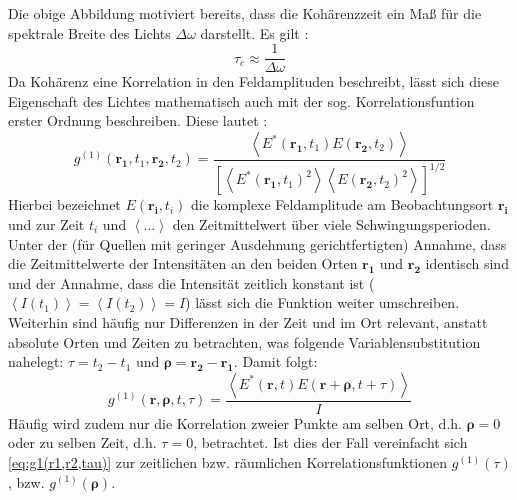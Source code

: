 Die obige Abbildung motiviert bereits, dass die Kohärenzzeit ein Maß für die spektrale Breite des Lichts $\Delta \omega$ darstellt. 
Es gilt \cite{foxQuantumOpticsIntroduction2006}:
\begin{equation}
    \tau_c  \approx \frac{1}{\Delta \omega}
    \label{eq:tau(delta nu)}
\end{equation}
Da Kohärenz eine Korrelation in den Feldamplituden beschreibt, lässt sich diese Eigenschaft des Lichtes mathematisch auch mit der sog. Korrelationsfuntion erster Ordnung beschreiben. 
Diese lautet \cite{foellmiIntensityInterferometrySecondorder2009}:
\begin{equation}
    g^{(1)}(\mathbf{r_1}, t_1, \mathbf{r_2}, t_2) = \frac{\left<E^*(\mathbf{r_1}, t_1)E(\mathbf{r_2}, t_2)\right>}{\left[\left<E^*(\mathbf{r_1}, t_1)^2\right> \left<E(\mathbf{r_2}, t_2)^2\right>\right]^{1/2}}
    \label{eq:g1(r1,t1,r2,t2)}
\end{equation}
Hierbei bezeichnet $E(\mathbf{r_i},t_i)$ die komplexe Feldamplitude am Beobachtungsort $\mathbf{r_i}$ und zur Zeit $t_i$ und $\left<\dots\right>$ den Zeitmittelwert über viele Schwingungsperioden. 
Unter der (für Quellen mit geringer Ausdehnung gerichtfertigten) Annahme, dass die Zeitmittelwerte der Intensitäten an den beiden Orten $\mathbf{r_1}$ und $\mathbf{r_2}$ identisch sind und der Annahme, dass die Intensität zeitlich konstant ist ($\left<I(t_1)\right>=\left<I(t_2)\right>=I$) lässt sich die Funktion weiter umschreiben. 
Weiterhin sind häufig nur Differenzen in der Zeit und im Ort relevant, anstatt absolute Orten und Zeiten zu betrachten, was folgende Variablensubstitution nahelegt: $\tau = t_2 -t_1$ und $\bm{\rho} = \mathbf{r_2} - \mathbf{r_1}$. 
Damit folgt:
\begin{equation}
    g^{(1)}(\mathbf{r}, \bm{\rho}, t, \tau) = \frac{\left<E^*(\mathbf{r}, t)E(\mathbf{r}+\bm{\rho}, t+\tau)\right>}{I}
    \label{eq:g1(r1,r2,tau)}
\end{equation}
Häufig wird zudem nur die Korrelation zweier Punkte am selben Ort, d.h. $\bm{\rho}=0$ oder zu selben Zeit, d.h. $\tau=0$, betrachtet. 
Ist dies der Fall vereinfacht sich \autoref{eq:g1(r1,r2,tau)} zur zeitlichen bzw. räumlichen Korrelationsfunktionen $g^{(1)}(\tau)$, bzw. $g^{(1)}(\bm{\rho})$.


